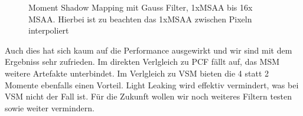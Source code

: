 \documentclass[runningheaders,a4paper]{llncs}
\begin{document}
\begin{figure}[H]
	\centering
	
	\caption{Moment Shadow Mapping mit Gauss Filter, 1xMSAA bis 16x MSAA. Hierbei ist zu beachten das 1xMSAA zwischen Pixeln interpoliert}
\end{figure}

Auch dies hat sich kaum auf die Performance ausgewirkt und wir sind mit dem Ergebniss sehr zufrieden.
Im direkten Verlgleich zu PCF fällt auf, das MSM weitere Artefakte unterbindet. Im Verlgleich zu VSM bieten die 4 statt 2 Momente ebenfalls einen Vorteil. Light Leaking wird effektiv vermindert, was bei VSM nicht der Fall ist.
Für die Zukunft wollen wir noch weiteres Filtern testen sowie weiter vermindern.
\end{document}
